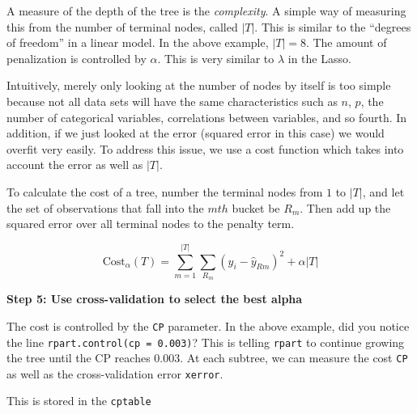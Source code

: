 \documentclass[openany]{book}
\newenvironment{Shaded}{\begin{snugshade}}{\end{snugshade}}
\newcommand{\DataTypeTok}[1]{\textcolor[rgb]{0.13,0.29,0.53}{#1}}
\newcommand{\FloatTok}[1]{\textcolor[rgb]{0.00,0.00,0.81}{#1}}
\newcommand{\KeywordTok}[1]{\textcolor[rgb]{0.13,0.29,0.53}{\textbf{#1}}}
\newcommand{\NormalTok}[1]{#1}
\newcommand{\OperatorTok}[1]{\textcolor[rgb]{0.81,0.36,0.00}{\textbf{#1}}}
\newcommand{\StringTok}[1]{\textcolor[rgb]{0.31,0.60,0.02}{#1}}
\begin{document}
A measure of the depth of the tree is the \emph{complexity}. A simple way of measuring this from the number of terminal nodes, called \(|T|\). This is similar to the ``degrees of freedom'' in a linear model. In the above example, \(|T| = 8\). The amount of penalization is controlled by \(\alpha\). This is very similar to \(\lambda\) in the Lasso.

Intuitively, merely only looking at the number of nodes by itself is too simple because not all data sets will have the same characteristics such as \(n\), \(p\), the number of categorical variables, correlations between variables, and so fourth. In addition, if we just looked at the error (squared error in this case) we would overfit very easily. To address this issue, we use a cost function which takes into account the error as well as \(|T|\).

To calculate the cost of a tree, number the terminal nodes from \(1\) to \(|T|\), and let the set of observations that fall into the \(mth\) bucket be \(R_m\). Then add up the squared error over all terminal nodes to the penalty term.

\[
\text{Cost}_\alpha(T) = \sum_{m=1}^{|T|} \sum_{R_m}(y_i - \hat{y}_{Rm})^2 + \alpha |T|
\]

\textbf{Step 5: Use cross-validation to select the best alpha}

The cost is controlled by the \texttt{CP} parameter. In the above example, did you notice the line \texttt{rpart.control(cp\ =\ 0.003)}? This is telling \texttt{rpart} to continue growing the tree until the CP reaches 0.003. At each subtree, we can measure the cost \texttt{CP} as well as the cross-validation error \texttt{xerror}.

This is stored in the \texttt{cptable}

\begin{Shaded}
\end{Shaded}
\end{document}

